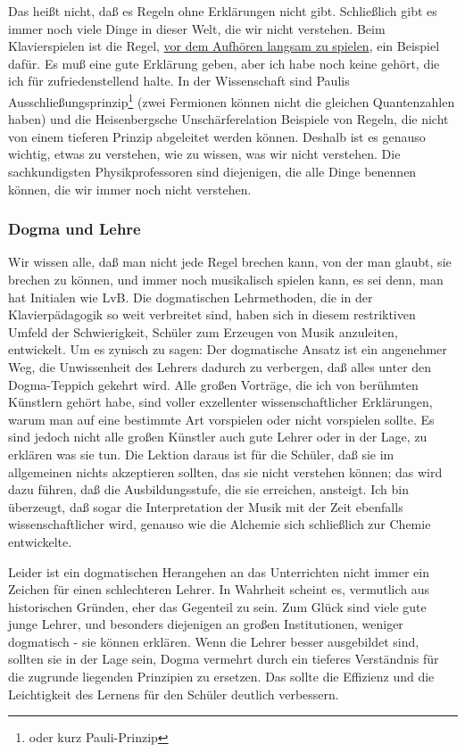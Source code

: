 Das heißt nicht, daß es Regeln ohne Erklärungen nicht gibt.
Schließlich gibt es immer noch viele Dinge in dieser Welt, die wir nicht verstehen.
Beim Klavierspielen ist die Regel, \hyperref[c1ii17]{vor dem Aufhören langsam zu spielen}, ein Beispiel dafür.
Es muß eine gute Erklärung geben, aber ich habe noch keine gehört, die ich für zufriedenstellend halte.
In der Wissenschaft sind Paulis Ausschließungsprinzip\footnote{oder kurz Pauli-Prinzip} (zwei Fermionen können nicht die gleichen Quantenzahlen haben) und die Heisenbergsche Unschärferelation Beispiele von Regeln, die nicht von einem tieferen Prinzip abgeleitet werden können.
Deshalb ist es genauso wichtig, etwas zu verstehen, wie zu wissen, was wir nicht verstehen.
Die sachkundigsten Physikprofessoren sind diejenigen, die alle Dinge benennen können, die wir immer noch nicht verstehen.


\subsubsection{Dogma und Lehre}
\label{c3_3g}

Wir wissen alle, daß man nicht jede Regel brechen kann, von der man glaubt, sie brechen zu können, und immer noch musikalisch spielen kann, es sei denn, man hat Initialen wie LvB.
Die dogmatischen Lehrmethoden, die in der Klavierpädagogik so weit verbreitet sind, haben sich in diesem restriktiven Umfeld der Schwierigkeit, Schüler zum Erzeugen von Musik anzuleiten, entwickelt.
Um es zynisch zu sagen: Der dogmatische Ansatz ist ein angenehmer Weg, die Unwissenheit des Lehrers dadurch zu verbergen, daß alles unter den Dogma-Teppich gekehrt wird.
Alle großen Vorträge, die ich von berühmten Künstlern gehört habe, sind voller exzellenter wissenschaftlicher Erklärungen, warum man auf eine bestimmte Art vorspielen oder nicht vorspielen sollte.
Es sind jedoch nicht alle großen Künstler auch gute Lehrer oder in der Lage, zu erklären was sie tun.
Die Lektion daraus ist für die Schüler, daß sie im allgemeinen nichts akzeptieren sollten, das sie nicht verstehen können; das wird dazu führen, daß die Ausbildungsstufe, die sie erreichen, ansteigt.
Ich bin überzeugt, daß sogar die Interpretation der Musik mit der Zeit ebenfalls wissenschaftlicher wird, genauso wie die Alchemie sich schließlich zur Chemie entwickelte.

Leider ist ein dogmatischen Herangehen an das Unterrichten nicht immer ein Zeichen für einen schlechteren Lehrer.
In Wahrheit scheint es, vermutlich aus historischen Gründen, eher das Gegenteil zu sein.
Zum Glück sind viele gute junge Lehrer, und besonders diejenigen an großen Institutionen, weniger dogmatisch - sie können erklären.
Wenn die Lehrer besser ausgebildet sind, sollten sie in der Lage sein, Dogma vermehrt durch ein tieferes Verständnis für die zugrunde liegenden Prinzipien zu ersetzen.
Das sollte die Effizienz und die Leichtigkeit des Lernens für den Schüler deutlich verbessern.

